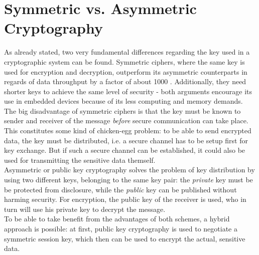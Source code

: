 \section{Symmetric vs. Asymmetric Cryptography}

As already stated, two very fundamental differences regarding the key used in a cryptographic system can be found. Symmetric ciphers, where 
the same key is used for encryption and decryption, outperform its asymmetric counterparts in regards of data throughput by a factor of about 1000 \cite{5412055}.
Additionally, they need shorter keys to achieve the same level of security - both arguments encourage its use in embedded devices because of its less computing
and memory demands.
\\
The big disadvantage of symmetric ciphers is that the key must be known to sender
and receiver of the message \textit{before} secure communication can take place. This constitutes some kind of chicken-egg problem: to be able to send encrypted
data, the key must be distributed, i.e. a secure channel has to be setup first for key exchange. But if such a secure channel can be established, it could also be used
for transmitting the sensitive data themself.
\\
Asymmetric or public key cryptography solves the problem of key distribution by using two different keys, belonging to the same key pair: the \textit{private}
key must be be protected from disclosure, while the \textit{public} key can be published without harming security. For encryption, the public key of the receiver
is used, who in turn will use his private key to decrypt the message. 
\\
To be able to take benefit from the advantages of both schemes, a hybrid approach is possible: at first, public key cryptography is used to negotiate a symmetric session
key, which then can be used to encrypt the actual, sensitive data.

